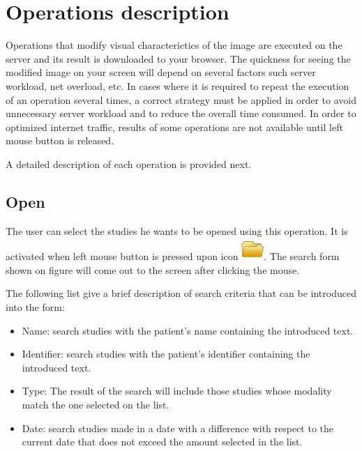 \documentclass{plantilla-manual-usuario-en}
\begin{document}
\section{Operations description}
Operations that modify visual characterictics of the image are executed on the server and its result is downloaded to your browser. The quickness for seeing the modified image on your screen will depend on several factors such server workload, net overload, etc. In cases where it is required to repeat the execution of an operation several times, a correct strategy must be applied in order to avoid unnecessary server workload and to reduce the overall time consumed. In order to optimized internet traffic, results of some operations are not available until left mouse button is released.

A detailed description of each operation is provided next.

\subsection{Open}
\label{seccionAbrir}

The user can select the studies he wants to be opened using this operation. It is activated when left mouse button is pressed upon icon \includegraphics[scale=0.5]{images/open.png}. The search form shown on figure  will come out to the screen after clicking the mouse.  


The following list give a brief description of search criteria that can be introduced into the form:

\begin{itemize}
\item Name: search studies with the patient's name containing the introduced text. 
\item Identifier: search studies with the patient's identifier containing the introduced text. 
\item Type: The result of the search will include those studies whose modality match the one selected on the list. 
\item Date: search studies made in a date with a difference with respect to the current date that does not exceed the amount selected in the list. 
\end{itemize}
\end{document}
